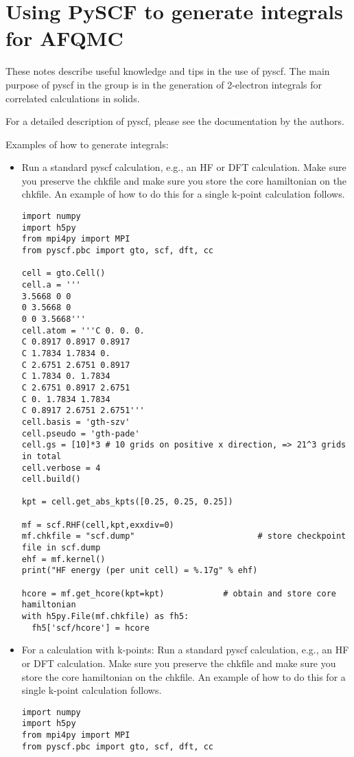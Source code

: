 \section{Using PySCF to generate integrals for AFQMC}
\label{sec:pyscf}
These notes describe useful knowledge and tips in the use of pyscf. 
The main purpose of pyscf in the group is in the generation of 2-electron integrals for correlated calculations in solids.

For a detailed description of pyscf, please see the documentation by the authors.

Examples of how to generate integrals:
\begin{itemize}
\item Run a standard pyscf calculation, e.g., an HF or DFT calculation. Make sure you preserve the chkfile and make sure you store the core hamiltonian on the chkfile. An example of how to do this for a single k-point calculation follows.
\begin{lstlisting}[style=Python,caption=The following is an example PySCF input file for single k-point calculations.]
import numpy
import h5py
from mpi4py import MPI
from pyscf.pbc import gto, scf, dft, cc

cell = gto.Cell()
cell.a = '''
3.5668 0 0
0 3.5668 0
0 0 3.5668'''
cell.atom = '''C 0. 0. 0. 
C 0.8917 0.8917 0.8917
C 1.7834 1.7834 0. 
C 2.6751 2.6751 0.8917
C 1.7834 0. 1.7834
C 2.6751 0.8917 2.6751
C 0. 1.7834 1.7834
C 0.8917 2.6751 2.6751'''
cell.basis = 'gth-szv'
cell.pseudo = 'gth-pade'
cell.gs = [10]*3 # 10 grids on positive x direction, => 21^3 grids in total
cell.verbose = 4
cell.build()

kpt = cell.get_abs_kpts([0.25, 0.25, 0.25])  

mf = scf.RHF(cell,kpt,exxdiv=0)
mf.chkfile = "scf.dump"                         # store checkpoint file in scf.dump
ehf = mf.kernel()
print("HF energy (per unit cell) = %.17g" % ehf)

hcore = mf.get_hcore(kpt=kpt)            # obtain and store core hamiltonian
with h5py.File(mf.chkfile) as fh5:
  fh5['scf/hcore'] = hcore
\end{lstlisting}

\item {For a calculation with k-points:
Run a standard pyscf calculation, e.g., an HF or DFT calculation. Make sure you preserve the chkfile and make sure you store the core hamiltonian on the chkfile. An example of how to do this for a single k-point calculation follows.}

\begin{lstlisting}[style=Python,caption=The following is an example PySCF input file for calculations with k-points.]
import numpy
import h5py
from mpi4py import MPI
from pyscf.pbc import gto, scf, dft, cc


\end{lstlisting}
\end{itemize}
